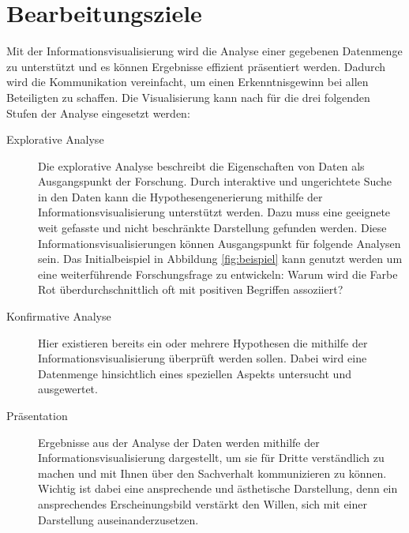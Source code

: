 \documentclass[a4paper, 12pt, DIV=calc, version=first, pdftex, headsepline, footsepline, bibtotocnumbered, liststotocnumbered]{scrreprt}
\begin{document}
\section{Bearbeitungsziele}
\label{sec:Ziele}
Mit der Informationsvisualisierung wird die Analyse einer gegebenen Datenmenge zu unterstützt und
es können Ergebnisse effizient präsentiert werden. Dadurch wird die Kommunikation vereinfacht,
um einen Erkenntnisgewinn bei allen Beteiligten zu schaffen.
Die Visualisierung kann nach \citep{Schumann} für die drei folgenden Stufen der Analyse eingesetzt werden:
\begin{description}
\item[Explorative Analyse]
Die explorative Analyse beschreibt die Eigenschaften von Daten als Ausgangspunkt der Forschung.
Durch interaktive und ungerichtete Suche in den Daten
kann die Hypothesengenerierung mithilfe der Informationsvisualisierung unterstützt werden. Dazu muss eine
geeignete weit gefasste und nicht beschränkte Darstellung gefunden werden. Diese Informationsvisualisierungen
können Ausgangspunkt für folgende Analysen sein. Das Initialbeispiel in Abbildung \ref{fig:beispiel} kann
genutzt werden um eine weiterführende Forschungsfrage zu entwickeln: Warum wird die Farbe Rot überdurchschnittlich
oft mit positiven Begriffen assoziiert?
\item[Konfirmative Analyse]
Hier existieren bereits ein oder mehrere Hypothesen die mithilfe der Informationsvisualisierung überprüft werden sollen.
Dabei wird eine Datenmenge hinsichtlich eines speziellen Aspekts untersucht und ausgewertet.
\item[Präsentation]
Ergebnisse aus der Analyse der Daten werden mithilfe der Informationsvisualisierung dargestellt, um sie für Dritte verständlich
zu machen und mit Ihnen über den Sachverhalt kommunizieren zu können.
Wichtig ist dabei eine ansprechende und ästhetische Darstellung, denn
ein ansprechendes Erscheinungsbild verstärkt den Willen, sich mit einer Darstellung auseinanderzusetzen.
\end{description}
\end{document}
